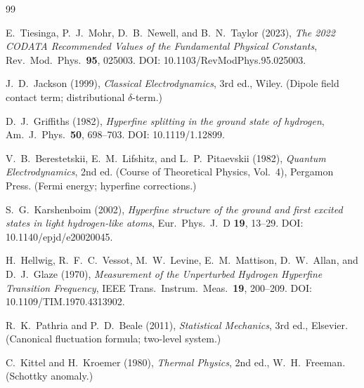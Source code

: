 \documentclass[11pt,a4paper]{article}
\begin{document}
    \begin{thebibliography}{99}
        
        E.~Tiesinga, P.~J.~Mohr, D.~B.~Newell, and B.~N.~Taylor (2023),
        \textit{The 2022 CODATA Recommended Values of the Fundamental Physical Constants},
        Rev.\ Mod.\ Phys.\ \textbf{95}, 025003.
        DOI: 10.1103/RevModPhys.95.025003.
        
        J.~D.~Jackson (1999),
        \textit{Classical Electrodynamics}, 3rd ed.,
        Wiley. (Dipole field contact term; distributional $\delta$-term.)
        
        D.~J.~Griffiths (1982),
        \textit{Hyperfine splitting in the ground state of hydrogen},
        Am.\ J.\ Phys.\ \textbf{50}, 698--703.
        DOI: 10.1119/1.12899.
        
        V.~B.~Berestetskii, E.~M.~Lifshitz, and L.~P.~Pitaevskii (1982),
        \textit{Quantum Electrodynamics}, 2nd ed. (Course of Theoretical Physics, Vol.~4),
        Pergamon Press. (Fermi energy; hyperfine corrections.)
        
        S.~G.~Karshenboim (2002),
        \textit{Hyperfine structure of the ground and first excited states in light hydrogen-like atoms},
        Eur.\ Phys.\ J.\ D \textbf{19}, 13--29.
        DOI: 10.1140/epjd/e20020045.
        
        H.~Hellwig, R.~F.~C.~Vessot, M.~W.~Levine, E.~M.~Mattison, D.~W.~Allan, and D.~J.~Glaze (1970),
        \textit{Measurement of the Unperturbed Hydrogen Hyperfine Transition Frequency},
        IEEE Trans.\ Instrum.\ Meas.\ \textbf{19}, 200--209.
        DOI: 10.1109/TIM.1970.4313902.
        
        R.~K.~Pathria and P.~D.~Beale (2011),
        \textit{Statistical Mechanics}, 3rd ed.,
        Elsevier. (Canonical fluctuation formula; two-level system.)
        
        C.~Kittel and H.~Kroemer (1980),
        \textit{Thermal Physics}, 2nd ed.,
        W.\ H.\ Freeman. (Schottky anomaly.)
    
    \end{thebibliography}
\end{document}
